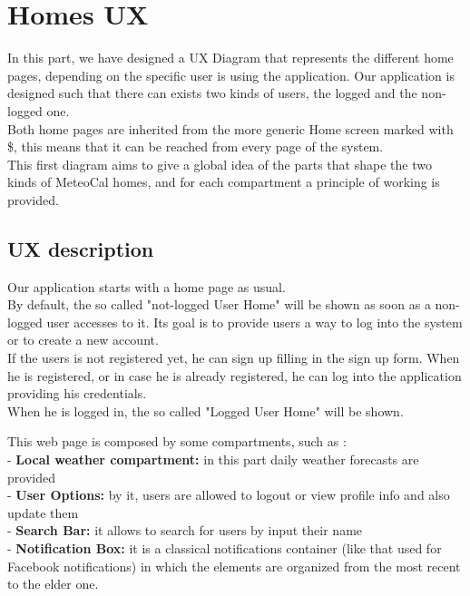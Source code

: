 \documentclass[12pt]{book}
\begin{document}
\section{Homes UX}
In this part, we have designed a UX Diagram that represents the different home pages, depending on the specific user is using the application. Our application is designed such that there can exists two kinds of users, the logged and the non-logged one. \\
Both home pages are inherited from the more generic Home screen marked with \$, this means that it can be reached from every page of the system. \\
This first diagram aims to give a global idea of the parts that shape the two kinds of MeteoCal homes, and for each compartment a principle of working is provided. \\
\subsection{UX description}
Our application starts with a home page as usual. \\
By default, the so called "not-logged User Home" will be shown as soon as a non-logged user accesses to it. Its goal is to provide users a way to log into the system or to create a new account. \\

If the users is not registered yet, he can sign up filling in the sign up form. When he is registered, or in case he is already registered, he can log into the application providing his credentials. \\
When he is logged in, the so called "Logged User Home" will be shown. 

This web page is composed by some compartments, such as : \\

- \textbf{Local weather compartment: }in this part daily weather forecasts are provided \\

- \textbf{User Options: }by it, users are allowed to logout or view profile info and also update them\\

- \textbf{Search Bar: }it allows to search for users by input their name \\

- \textbf{Notification Box: }it is a classical notifications container (like that used for Facebook notifications) in which the elements are organized from the most recent to the elder one. \\
\end{document}
